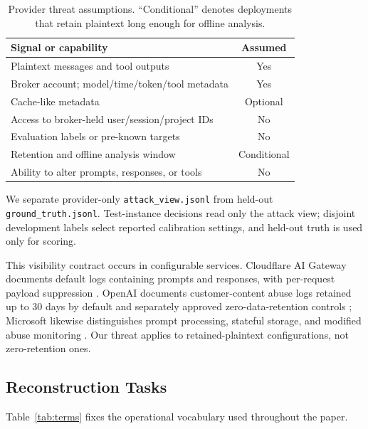 \documentclass[letterpaper]{article}
\begin{document}
\begin{table}[h]
\centering
\small
\begin{tabular}{@{}p{}c@{}}
\toprule
Signal or capability & Assumed \\
\midrule
Plaintext messages and tool outputs & Yes \\
Broker account; model/time/token/tool metadata & Yes \\
Cache-like metadata & Optional \\
Access to broker-held user/session/project IDs & No \\
Evaluation labels or pre-known targets & No \\
Retention and offline analysis window & Conditional \\
Ability to alter prompts, responses, or tools & No \\
\bottomrule
\end{tabular}
\caption{Provider threat assumptions. ``Conditional'' denotes deployments that retain plaintext
long enough for offline analysis.}
\label{tab:assumptions}
\end{table}

We separate provider-only \texttt{attack\_view.jsonl} from held-out
\texttt{ground\_truth.jsonl}. Test-instance decisions read only the attack view; disjoint
development labels select reported calibration settings, and held-out truth is used only for scoring.

This visibility contract occurs in configurable services. Cloudflare AI Gateway documents
default logs containing prompts and responses, with per-request payload suppression
\cite{cloudflare2026gatewaylogs}. OpenAI documents customer-content abuse logs retained up to 30
days by default and separately approved zero-data-retention controls
\cite{openai2026datacontrols}; Microsoft likewise distinguishes prompt processing, stateful
storage, and modified abuse monitoring \cite{microsoft2026foundryprivacy}. Our threat applies to
retained-plaintext configurations, not zero-retention ones.

\subsection{Reconstruction Tasks}

Table~\ref{tab:terms} fixes the operational vocabulary used throughout the paper.
\end{document}
